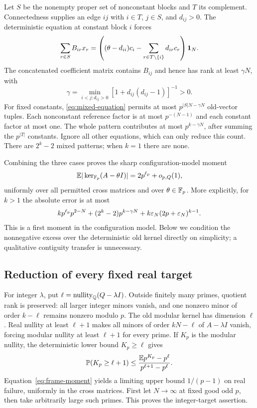 Let $S$ be the nonempty proper set of nonconstant blocks and $T$ its
complement. Connectedness supplies an edge $ij$ with $i\in T$,
$j\in S$, and $d_{ij}>0$. The deterministic equation at constant
block $i$ forces
\begin{equation}\label{eq:mixed-equation}
 \sum_{r\in S}B_{ir}x_r
 =\left((\theta-d_{ii})c_i-
           \sum_{r\in T\setminus\{i\}}d_{ir}c_r\right)\mathbf 1_N.
\end{equation}
The concatenated coefficient matrix contains $B_{ij}$ and hence has
rank at least $\gamma N$, with
\[
 \gamma=\min_{i<j:d_{ij}>0}[1+d_{ij}(d_{ij}-1)]^{-1}>0.
\]
For fixed constants, \eqref{eq:mixed-equation} permits at most
$p^{|S|N-\gamma N}$ old-vector tuples. Each nonconstant reference
factor is at most $p^{-(N-1)}$ and each constant factor at most one.
The whole pattern contributes at most $p^{k-\gamma N}$, after summing
the $p^{|T|}$ constants. Ignore all other equations, which can only
reduce this count. There are $2^k-2$ mixed patterns; when $k=1$ there
are none.

Combining the three cases proves the sharp configuration-model moment
\begin{equation}\label{eq:frame-moment}
 \mathbb E|\ker_{\mathbb F_p}(A-\theta I)|
 =2p^{\ell_p}+o_{p,Q}(1),
\end{equation}
uniformly over all permitted cross matrices and over $\theta\in\mathbb F_p$.
More explicitly, for $k>1$ the absolute error is at most
\[
 kp^{\ell_p}p^{2-N}+(2^k-2)p^{k-\gamma N}
       +k\varepsilon_N(2p+\varepsilon_N)^{k-1}.
\]
This is a first moment in the configuration model. Below we condition
the nonnegative excess over the deterministic old kernel directly
on simplicity; a qualitative contiguity transfer is unnecessary.

\subsection{Reduction of every fixed real target}
For integer $\lambda$, put $\ell=\operatorname{nullity}_\mathbb Q(Q-\lambda I)$.
Outside finitely many primes, quotient rank is preserved: all larger
integer minors vanish, and one nonzero minor of order $k-\ell$
remains nonzero modulo $p$. The old modular kernel has dimension
$\ell$. Real nullity at least $\ell+1$ makes all minors of order
$kN-\ell$ of $A-\lambda I$ vanish, forcing modular nullity at least
$\ell+1$ for every prime. If $K_p$ is the modular nullity, the
deterministic lower bound $K_p\ge\ell$ gives
\begin{equation}\label{eq:subtracted-markov}
 \mathbb P(K_p\ge\ell+1)
 \le\frac{\mathbb E p^{K_p}-p^\ell}{p^{\ell+1}-p^\ell}.
\end{equation}
Equation~\eqref{eq:frame-moment} yields a limiting upper bound
$1/(p-1)$ on real failure, uniformly in the cross matrices.
First let $N\to\infty$ at fixed good odd $p$, then take arbitrarily
large such primes. This proves the integer-target assertion.

